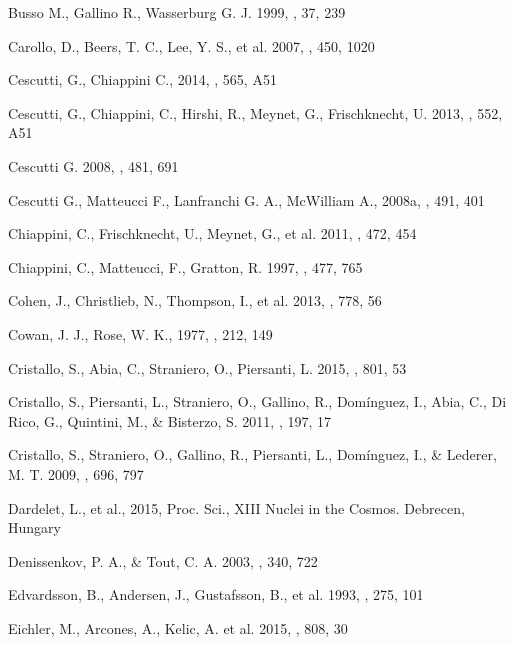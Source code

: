 \documentclass[manuscript]{aastex}
\begin{document}
\begin{thebibliography}{}
Busso M., Gallino R., Wasserburg G. J. 1999, \araa, 37, 239

Carollo, D., Beers, T. C., Lee, Y. S., et al. 2007, \nat, 450, 1020

Cescutti, G., Chiappini C., 2014, \aap, 565, A51

Cescutti, G., Chiappini, C., Hirshi, R., Meynet, G., 
Frischknecht, U. 2013, \aap, 552, A51

Cescutti G. 2008, \aap, 481, 691

Cescutti G., Matteucci F., Lanfranchi G. A., McWilliam A., 2008a, \aap,
491, 401

Chiappini, C., Frischknecht, U., Meynet, G., et al. 2011, \nat, 
 472, 454

Chiappini, C., Matteucci, F., Gratton, R. 1997, \apj, 477, 765

Cohen, J., Christlieb, N., Thompson, I., et al. 2013, \apj, 778, 56

Cowan, J. J., Rose, W. K., 1977, \apj, 212, 149

Cristallo, S., Abia, C., Straniero, O., Piersanti, L. 2015, \apj, 801, 53

Cristallo, S., Piersanti, L., Straniero, O., Gallino, R., Dom{\'i}nguez, I.,
Abia, C., Di Rico, G., Quintini, M., \& Bisterzo, S. 2011, \apjs, 197, 17

Cristallo, S., Straniero, O., Gallino, R., Piersanti, L., Dom{\'i}nguez, I.,
\& Lederer, M. T. 2009, \apj, 696, 797

Dardelet, L., et al., 2015, Proc. Sci., XIII Nuclei in the Cosmos. Debrecen,
Hungary

Denissenkov, P. A., \& Tout, C. A. 2003, \mnras, 340, 722

Edvardsson, B., Andersen, J., Gustafsson, B., et al. 1993, \aap, 275, 101

Eichler, M., Arcones, A., Kelic, A. et al. 2015, \apj, 808, 30


\end{thebibliography}
\end{document}
